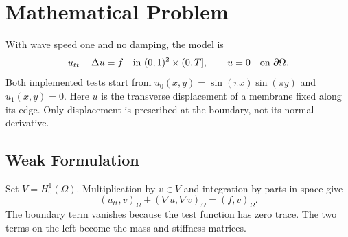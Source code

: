 \chapter{Mathematical Problem}

With wave speed one and no damping, the model is
\[
 u_{tt}-\Delta u=f \quad\hbox{in }(0,1)^2\times(0,T],\qquad
 u=0\quad\hbox{on }\partial\Omega.
\]
Both implemented tests start from
\(u_0(x,y)=\sin(\pi x)\sin(\pi y)\) and \(u_1(x,y)=0\).
Here \(u\) is the transverse displacement of a membrane fixed along its edge.
Only displacement is prescribed at the boundary, not its normal derivative.

\section{Weak Formulation}
Set \(V=H^1_0(\Omega)\). Multiplication by \(v\in V\) and integration by parts
in space give
\[
 (u_{tt},v)_\Omega+(\nabla u,\nabla v)_\Omega=(f,v)_\Omega.
\]
The boundary term vanishes because the test function has zero trace.
The two terms on the left become the mass and stiffness matrices.
